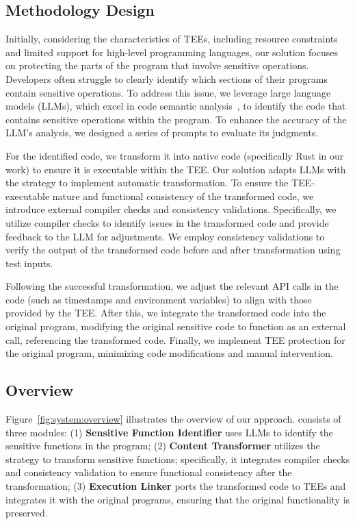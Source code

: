 \subsection{Methodology Design}
Initially, considering the characteristics of TEEs, including resource constraints and limited support for high-level programming languages, our solution focuses on protecting the parts of the program that involve sensitive operations.
Developers often struggle to clearly identify which sections of their programs contain sensitive operations.
To address this issue, we leverage large language models (LLMs), which excel in code semantic analysis~\cite{yan2023closer,wu2023effective,ren2023misuse}, to identify the code that contains sensitive operations within the program.
To enhance the accuracy of the LLM's analysis, we designed a series of prompts to evaluate its judgments.

For the identified code, we transform it into native code (specifically Rust in our work) to ensure it is executable within the TEE.
Our solution adapts LLMs with the  strategy to implement automatic transformation.
To ensure the TEE-executable nature and functional consistency of the transformed code, we introduce external compiler checks and consistency validations.
Specifically, we utilize compiler checks to identify issues in the transformed code and provide feedback to the LLM for adjustments.
We employ consistency validations to verify the output of the transformed code before and after transformation using test inputs.

Following the successful transformation, we adjust the relevant API calls in the code (such as timestamps and environment variables) to align with those provided by the TEE.
After this, we integrate the transformed code into the original program, modifying the original sensitive code to function as an external call, referencing the transformed code.
Finally, we implement TEE protection for the original program, minimizing code modifications and manual intervention.

\subsection{Overview}
Figure~\ref{fig:system:overview} illustrates the overview of our approach.
\system consists of three modules: 
(1) \textbf{Sensitive Function Identifier} uses LLMs to identify the sensitive functions in the program;
(2) \textbf{Content Transformer} utilizes the  strategy to transform sensitive functions; specifically, it integrates compiler checks and consistency validation to ensure functional consistency after the transformation;
(3) \textbf{Execution Linker} ports the transformed code to TEEs and integrates it with the original programs, ensuring that the original functionality is preserved.

